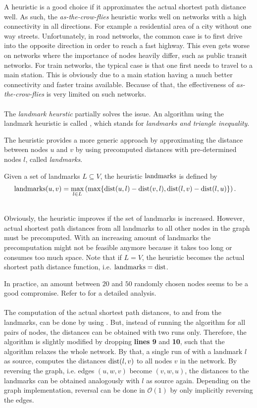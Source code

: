 	A heuristic is a good choice if it approximates the actual shortest path distance well. As such, the \textit{as-the-crow-flies} heuristic works well
	on networks with a high connectivity in all directions. For example a residential area of a city without one way streets. Unfortunately, in road
	networks, the common case is to first drive into the opposite direction in order to reach a fast highway. This even gets worse on networks
	where the importance of nodes heavily differ, such as public transit networks. For train networks, the typical case is that one first needs
	to travel to a main station. This is obviously due to a main station having a much better connectivity and faster trains available.
	Because of that, the effectiveness of \textit{as-the-crow-flies} is very limited on such networks.\\\\
	The \textit{landmark heurstic} partially solves the issue. An \astar algorithm using the landmark heuristic is called \alt {},
	which stands for \textit{landmarks and triangle inequality}.
	
	The heuristic provides a more generic approach by approximating the distance
	between nodes $u$ and $v$ by using precomputed distances with pre-determined nodes $l$, called \textit{landmarks}.
	\begin{mydef}\label{alt_heuristic}
		Given a set of landmarks $L \subseteq V$, the heuristic $\operatorname{landmarks}$ is defined by
		\begin{align*}
			\operatorname{landmarks}(u, v)	&= \max_{l \in L} \left(\max \{\operatorname{dist}(u, l) - \operatorname{dist}(v, l), \operatorname{dist}(l, v) - \operatorname{dist}(l, u)\}\right).
		\end{align*}
	\end{mydef}\quad\\
	Obviously, the heuristic improves if the set of landmarks is increased. However, actual shortest path distances from all landmarks
	to all other nodes in the graph must be precomputed. With an increasing amount of landmarks the precomputation might not
	be feasible anymore because it takes too long or consumes too much space. Note that if $L = V$, the heuristic becomes the
	actual shortest path distance function, i.e. $\operatorname{landmarks} = \operatorname{dist}$.
	
	In practice, an amount between $20$ and $50$ randomly chosen nodes seems to be a good compromise.
	Refer to  for a detailed analysis.\\\\
	The computation of the actual shortest path distances, to and from the landmarks, can be done by using \dijkstra. But, instead of
	running the algorithm for all pairs of nodes, the distances can be obtained with two runs only. Therefore, the algorithm is slightly modified by dropping
	\textbf{lines 9} and \textbf{10}, such that the algorithm relaxes the whole network. By that, a single run of \dijkstra with a landmark $l$ as source,
	computes the distances $\operatorname{dist}(l, v)$ to all nodes $v$ in the network. By reversing the graph, i.e. edges $(u, w, v)$ become $(v, w, u)$, the distances to
	the landmarks can be obtained analogously with $l$ as source again. Depending on the graph implementation, reversal can be done
	in $\mathcal{O}(1)$ by only implicitly reversing the edges.

